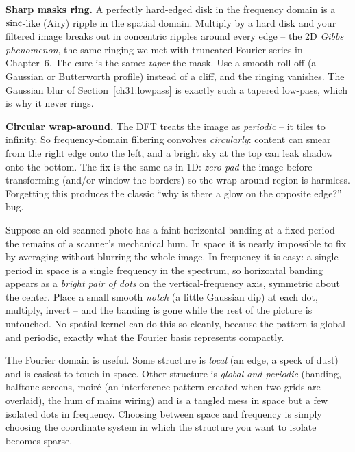 \begin{trapbox}
\textbf{Sharp masks ring.} A perfectly hard-edged disk in the frequency domain is a
$\operatorname{sinc}$-like (Airy) ripple in the spatial domain. Multiply by a hard disk and your
filtered image breaks out in concentric ripples around every edge -- the 2D
\emph{Gibbs phenomenon}, the same ringing we met with truncated Fourier series in
Chapter~6. The cure is the same: \emph{taper} the mask. Use a smooth roll-off (a
Gaussian or Butterworth profile) instead of a cliff, and the ringing vanishes. The
Gaussian blur of Section~\ref{ch31:lowpass} is exactly such a tapered low-pass,
which is why it never rings.
\end{trapbox}

\begin{trapbox}
\textbf{Circular wrap-around.} The DFT treats the image as \emph{periodic} -- it
tiles to infinity. So frequency-domain filtering convolves \emph{circularly}:
content can smear from the right edge onto the left, and a bright sky at the top can
leak shadow onto the bottom. The fix is the same as in 1D: \emph{zero-pad} the
image before transforming (and/or window the borders) so the wrap-around region is
harmless. Forgetting this produces the classic ``why is there a glow on the
opposite edge?'' bug.
\end{trapbox}

\begin{example}
\label{ch31:ex-notch}
Suppose an old scanned photo has a faint horizontal banding at a fixed period -- the
remains of a scanner's mechanical hum. In space it is nearly impossible to fix by
averaging without blurring the whole image. In frequency it is easy: a single
period in space is a single frequency in the spectrum, so horizontal banding
appears as a \emph{bright pair of dots} on the vertical-frequency axis, symmetric
about the center. Place a small smooth \emph{notch} (a little Gaussian dip) at each
dot, multiply, invert -- and the banding is gone while the rest of the picture is
untouched. No spatial kernel can do this so cleanly, because the pattern is global
and periodic, exactly what the Fourier basis represents compactly.
\end{example}

\begin{aestheticbox}
The Fourier domain is useful. Some structure is
\emph{local} (an edge, a speck of dust) and is easiest to touch in space. Other
structure is \emph{global and periodic} (banding, halftone screens, moir\'e (an interference pattern created when two grids are overlaid), the
hum of mains wiring) and is a tangled mess in space but a few isolated dots in
frequency. Choosing between space and frequency is simply choosing the coordinate system in which
the structure you want to isolate becomes sparse.
\end{aestheticbox}

